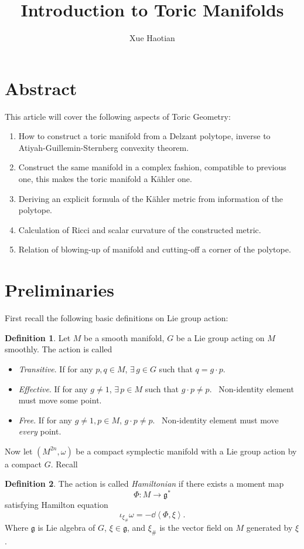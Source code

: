 \documentclass[12pt]{article}
\title{Introduction to Toric Manifolds}
\author{Xue Haotian}
\theoremstyle{plain}\newtheorem{theorem}{Theorem}
\theoremstyle{definition}\newtheorem{definition}[theorem]{Definition}
\theoremstyle{definition}\newtheorem{example}[theorem]{Example}
\theoremstyle{plain}\newtheorem{axiom}[theorem]{Axiom}
\theoremstyle{plain}\newtheorem{assertion}[theorem]{Assertion}
\theoremstyle{plain}\newtheorem{corollary}[theorem]{Corollary}
\theoremstyle{plain}\newtheorem{lemma}[theorem]{Lemma}
\theoremstyle{plain}\newtheorem{proposition}[theorem]{Proposition}
\theoremstyle{plain}\newtheorem{prop}[theorem]{Proposition}
\theoremstyle{plain}\newtheorem{conjecture}[theorem]{Conjecture}
\theoremstyle{plain}\newtheorem{conj}[theorem]{Conjecture}
\theoremstyle{plain}\newtheorem{problem}[theorem]{Problem}
\theoremstyle{remark}\newtheorem{notation}[theorem]{Notation}
\theoremstyle{definition}\newtheorem*{question}{Question}
\theoremstyle{definition}\newtheorem*{answer}{Answer}
\theoremstyle{definition}\newtheorem*{goal}{Goal}
\theoremstyle{plain}\newtheorem*{application}{Application}
\theoremstyle{plain}\newtheorem*{exercise}{Exercise}
\theoremstyle{remark}\newtheorem*{remark}{Remark}
\theoremstyle{remark}\newtheorem*{note}{\small{Note}}
\numberwithin{equation}{section}
\numberwithin{theorem}{section}
\numberwithin{figure}{section}
\begin{document}
\maketitle

\section*{Abstract}
This article will cover the following aspects of Toric Geometry:
\begin{enumerate}[(1)]
\item How to construct a toric manifold from a Delzant polytope, inverse
    to Atiyah-Guillemin-Sternberg convexity theorem.
\item Construct the same manifold in a complex fashion, compatible to previous one,
    this makes the toric manifold a K\"ahler one.
\item Deriving an explicit formula of the K\"ahler metric from information of the
    polytope.
\item Calculation of Ricci and scalar curvature of the constructed metric.
\item Relation of blowing-up of manifold and cutting-off a corner of the polytope.
\end{enumerate}

\section{Preliminaries}
First recall the following basic definitions on Lie group action:
\begin{definition}
    Let \(M\) be a smooth manifold, \(G\) be a Lie group acting on \(M\) smoothly.
    The action is called
    \begin{itemize}
    \item \emph{Transitive}. If for any \(p,q\in M\), \(\exists\,g\in G\) such that
        \(q=g\cdot p\).
    \item \emph{Effective}. If for any \(g\neq 1\), \(\exists\,p\in M\) such that
        \(g\cdot p\neq p\). \ie\ Non-identity element must move some point.
    \item \emph{Free}. If for any \(g\neq 1,p\in M\), \(g\cdot p\neq p\).
        \ie\ Non-identity element must move \emph{every} point.
    \end{itemize}
\end{definition}

Now let \((M^{2n},\omega)\) be a compact symplectic manifold with a Lie group action
by a compact \(G\). Recall
\begin{definition}
    The action is called \emph{Hamiltonian} if there exists a moment map \[
        \Phi\colon M\longrightarrow \mathfrak{g}^*
    \] satisfying Hamilton equation \[
        \iota_{\xi_{\#}}\omega=-\dd \left<\Phi,\xi\right> 
    .\] Where \(\mathfrak{g}\) is Lie algebra of \(G\), \(\xi\in \mathfrak{g}\),
    and \(\xi_{\#}\) is the vector field on \(M\) generated by \(\xi\).
\end{definition}
\end{document}
